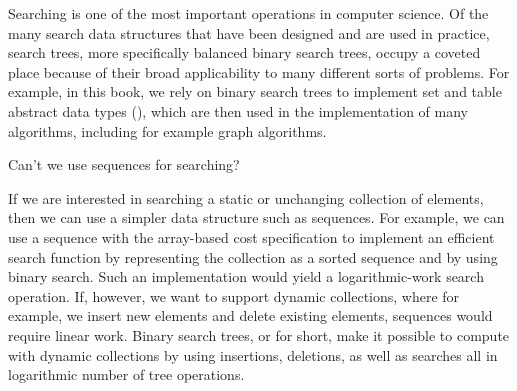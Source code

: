\begin{chapter}
\label{ch:bst}
\label{ch:bsts}


Searching is one of the most important operations in computer science.
Of the many search data structures that have been designed and are
used in practice, search trees, more specifically balanced binary
search trees, occupy a coveted place because of their broad
applicability to many different sorts of problems.  For example, in
this book, we rely on binary search trees to implement set and table
abstract data types (), which are then used in the
implementation of many algorithms, including for example graph
algorithms.


\begin{question}
Can't we use sequences for searching? 
\end{question}
If we are interested in searching a static or unchanging collection of
elements, then we can use a simpler data structure such as sequences.
%
For example, we can use a sequence with the array-based cost
specification to implement an efficient search function by
representing the collection as a sorted sequence and by using binary
search.  
%
Such an implementation would yield a logarithmic-work search
operation.
%
If, however, we want to support dynamic collections, where for
example, we insert new elements and delete existing elements,
sequences would require linear work.
% 
Binary search trees, or  for short, make it possible to
compute with dynamic collections by using insertions, deletions, as
well as searches all in logarithmic number of tree operations.


\end{chapter}

